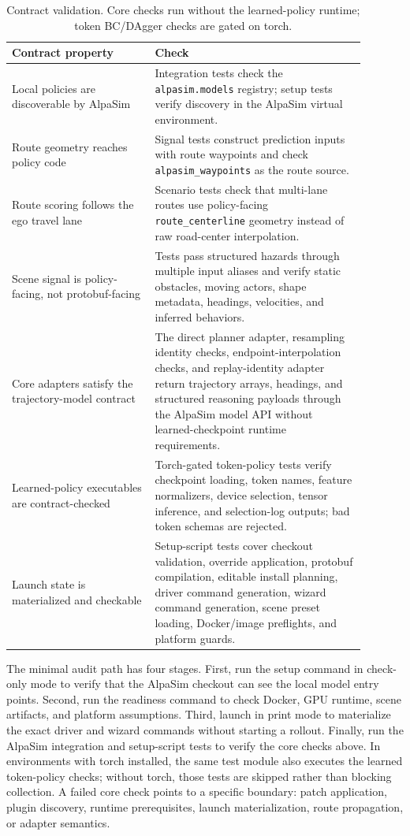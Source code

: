 \documentclass{article}
\begin{document}
\begin{table}[t]
\centering
\small
\begin{tabular}{p{0.36\linewidth}p{0.53\linewidth}}
\toprule
Contract property & Check \\
\midrule
Local policies are discoverable by AlpaSim &
Integration tests check the \texttt{alpasim.models} registry; setup tests verify
discovery in the AlpaSim virtual environment. \\
Route geometry reaches policy code &
Signal tests construct prediction inputs with route waypoints and check
\texttt{alpasim\_waypoints} as the route source. \\
Route scoring follows the ego travel lane &
Scenario tests check that multi-lane routes use policy-facing
\texttt{route\_centerline} geometry instead of raw road-center interpolation. \\
Scene signal is policy-facing, not protobuf-facing &
Tests pass structured hazards through multiple input aliases and verify static
obstacles, moving actors, shape metadata, headings, velocities, and inferred behaviors. \\
Core adapters satisfy the trajectory-model contract &
The direct planner adapter, resampling identity checks, endpoint-interpolation checks,
and replay-identity adapter return trajectory arrays, headings, and structured reasoning
payloads through the AlpaSim model API without learned-checkpoint runtime requirements. \\
Learned-policy executables are contract-checked &
Torch-gated token-policy tests verify checkpoint loading, token names, feature
normalizers, device selection, tensor inference, and selection-log outputs; bad token
schemas are rejected. \\
Launch state is materialized and checkable &
Setup-script tests cover checkout validation, override application, protobuf
compilation, editable install planning, driver command generation, wizard command
generation, scene preset loading, Docker/image preflights, and platform guards. \\
\bottomrule
\end{tabular}
\caption{Contract validation. Core checks run without the learned-policy runtime; token
BC/DAgger checks are gated on torch.}
\label{tab:artifact_validation}
\end{table}

The minimal audit path has four stages. First, run the setup command in
check-only mode to verify that the AlpaSim checkout can see the local model entry points.
Second, run the readiness command to check Docker, GPU runtime, scene artifacts, and
platform assumptions. Third, launch in print mode to materialize the exact driver and
wizard commands without starting a rollout. Finally, run the AlpaSim integration and
setup-script tests to verify the core checks above. In environments with torch installed,
the same test module also executes the learned token-policy checks; without torch, those
tests are skipped rather than blocking collection. A failed core check points to a
specific boundary: patch application, plugin discovery, runtime prerequisites, launch
materialization, route propagation, or adapter semantics.
\end{document}
